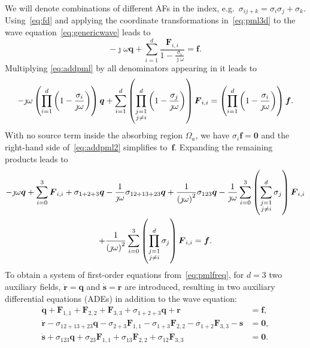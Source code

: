 \documentclass[a4paper]{article}
\renewcommand{\vec}{\boldsymbol}
\begin{document}
We will denote combinations of different AFs in the index,
e.g.~$\sigma_{ij + k} = \sigma_i \sigma_j + \sigma_k$.
Using~\eqref{eq:fd} and applying the coordinate transformations
in~\eqref{eq:pml3d} to the wave equation~\eqref{eq:genericwave} leads
to
\begin{equation}
  -\jmath\omega \vec{q}
  + \sum_{i = 1}^{d} \frac{\vec{F}_{i, i}}{1 -
  \frac{\sigma_{i}}{\jmath\omega}}
  = \vec{f}.
  \label{eq:addpml}
\end{equation}
Multiplying \eqref{eq:addpml} by all denominators appearing in it
leads to
\begin{equation}
  -\jmath \omega \del{\prod_{i = 1}^{d}\del{1 -
  \frac{\sigma_{i}}{\jmath\omega}}} \vec{q}
  + \sum_{i=1}^{d}\del{\prod_{\substack{j = 1
        \\ j \neq i}}^{d}
  \del{1 - \frac{\sigma_{j}}{\jmath\omega}}}\vec{F}_{i, i}
  = \del{\prod_{i=1}^{d}\del{1 - \frac{\sigma_{i}}{\jmath\omega}}} \vec{f}.
  \label{eq:addpml2}
\end{equation}
With no source term inside the absorbing region $\Omega_a$, we have
$\sigma_{i}\vec{f} = \vec{0}$ and the right-hand side
of~\eqref{eq:addpml2} simplifies to~$\vec{f}$.  Expanding the
remaining products leads to
\begin{multline}
  -\jmath\omega \vec{q}
  + \sum_{i = 0}^{3} \vec{F}_{i, i}
  + \sigma_{1 + 2 + 3}\vec{q}
  - \frac{1}{\jmath\omega}\sigma_{12+13+23}\vec{q}
  + \frac{1}{\del{\jmath\omega}^2}\sigma_{123}\vec{q}
  - \frac{1}{\jmath\omega} \sum_{i = 0}^{3} \del{\sum_{\substack{j = 1 \\ j
  \neq i}}^d\sigma_{j}}\vec{F}_{i,i}
\\
  + \frac{1}{\del{\jmath\omega}^2}\sum_{i = 0}^{3} \del{\prod_{\substack{j =
  1 \\ j \neq i}}^d\sigma_{j}}\vec{F}_{i,i}
  = \vec{f}.
  \label{eq:pmlfreq}
\end{multline}
To obtain a system of first-order equations from~\eqref{eq:pmlfreq},
for $d = 3 $ two auxiliary fields, $\Dot{\vec{r}} = \vec{q}$ and
$\Dot{\vec{s}} = \vec{r}$ are introduced, resulting in two auxiliary
differential equations (ADEs) in addition to the wave equation:
\begin{equation}
  \begin{aligned}
    \Dot{\vec{q}} + \vec{F}_{1, 1} + \vec{F}_{2, 2} + \vec{F}_{3, 3}
    + \sigma_{1+2+3}\vec{q} +\vec{r}
    &= \vec{f},
    \\
    \Dot{\vec{r}} - \sigma_{12+13+23}\vec{q} - \sigma_{2+3}\vec{F}_{1,1}
    - \sigma_{1+3}\vec{F}_{2,2} - \sigma_{1+2}\vec{F}_{3,3} - \vec{s}
    &= \vec{0},
    \\
    \Dot{\vec{s}} + \sigma_{123}\vec{q} + \sigma_{23}\vec{F}_{1,1}
    + \sigma_{13}\vec{F}_{2,2} + \sigma_{12}\vec{F}_{3,3}
    &= \vec{0}.
  \end{aligned}
  \label{eq:fullpml}
\end{equation}
\end{document}
